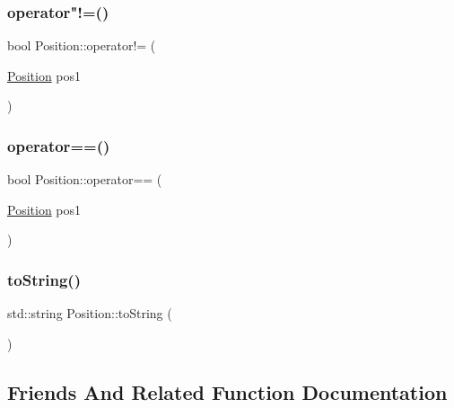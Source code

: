 \subsubsection{\texorpdfstring{operator"!=()}{operator!=()}}
{\footnotesize\ttfamily bool Position\+::operator!= (\begin{DoxyParamCaption}\item[{\hyperlink{struct_position}{Position}}]{pos1 }\end{DoxyParamCaption})\hspace{0.3cm}{\ttfamily [inline]}}

\mbox{\label{struct_position_a9a4a985957583381b09f874b86b8fa21}} 
\subsubsection{\texorpdfstring{operator==()}{operator==()}}
{\footnotesize\ttfamily bool Position\+::operator== (\begin{DoxyParamCaption}\item[{\hyperlink{struct_position}{Position}}]{pos1 }\end{DoxyParamCaption})\hspace{0.3cm}{\ttfamily [inline]}}

\mbox{\label{struct_position_a7940e4c278d50b49fa47c540665a3586}} 
\subsubsection{\texorpdfstring{to\+String()}{toString()}}
{\footnotesize\ttfamily std\+::string Position\+::to\+String (\begin{DoxyParamCaption}{ }\end{DoxyParamCaption})\hspace{0.3cm}{\ttfamily [inline]}}



\subsection{Friends And Related Function Documentation}
\mbox{\label{struct_position_a86474d9635197acafd2a0aeca048e2d1}} 

